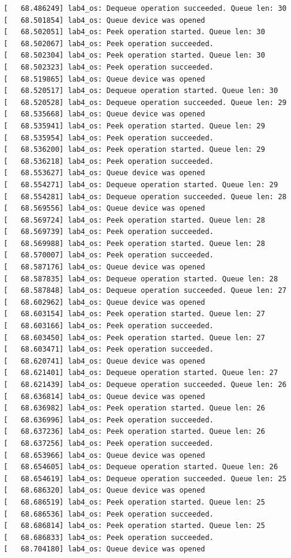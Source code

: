 \documentclass[a4paper,14pt]{extarticle}
\begin{document}
\begin{verbatim}
[   68.486249] lab4_os: Dequeue operation succeeded. Queue len: 30
[   68.501854] lab4_os: Queue device was opened
[   68.502051] lab4_os: Peek operation started. Queue len: 30
[   68.502067] lab4_os: Peek operation succeeded.
[   68.502304] lab4_os: Peek operation started. Queue len: 30
[   68.502323] lab4_os: Peek operation succeeded.
[   68.519865] lab4_os: Queue device was opened
[   68.520517] lab4_os: Dequeue operation started. Queue len: 30
[   68.520528] lab4_os: Dequeue operation succeeded. Queue len: 29
[   68.535668] lab4_os: Queue device was opened
[   68.535941] lab4_os: Peek operation started. Queue len: 29
[   68.535954] lab4_os: Peek operation succeeded.
[   68.536200] lab4_os: Peek operation started. Queue len: 29
[   68.536218] lab4_os: Peek operation succeeded.
[   68.553627] lab4_os: Queue device was opened
[   68.554271] lab4_os: Dequeue operation started. Queue len: 29
[   68.554281] lab4_os: Dequeue operation succeeded. Queue len: 28
[   68.569556] lab4_os: Queue device was opened
[   68.569724] lab4_os: Peek operation started. Queue len: 28
[   68.569739] lab4_os: Peek operation succeeded.
[   68.569988] lab4_os: Peek operation started. Queue len: 28
[   68.570007] lab4_os: Peek operation succeeded.
[   68.587176] lab4_os: Queue device was opened
[   68.587835] lab4_os: Dequeue operation started. Queue len: 28
[   68.587848] lab4_os: Dequeue operation succeeded. Queue len: 27
[   68.602962] lab4_os: Queue device was opened
[   68.603154] lab4_os: Peek operation started. Queue len: 27
[   68.603166] lab4_os: Peek operation succeeded.
[   68.603450] lab4_os: Peek operation started. Queue len: 27
[   68.603471] lab4_os: Peek operation succeeded.
[   68.620741] lab4_os: Queue device was opened
[   68.621401] lab4_os: Dequeue operation started. Queue len: 27
[   68.621439] lab4_os: Dequeue operation succeeded. Queue len: 26
[   68.636814] lab4_os: Queue device was opened
[   68.636982] lab4_os: Peek operation started. Queue len: 26
[   68.636996] lab4_os: Peek operation succeeded.
[   68.637236] lab4_os: Peek operation started. Queue len: 26
[   68.637256] lab4_os: Peek operation succeeded.
[   68.653966] lab4_os: Queue device was opened
[   68.654605] lab4_os: Dequeue operation started. Queue len: 26
[   68.654619] lab4_os: Dequeue operation succeeded. Queue len: 25
[   68.686320] lab4_os: Queue device was opened
[   68.686519] lab4_os: Peek operation started. Queue len: 25
[   68.686536] lab4_os: Peek operation succeeded.
[   68.686814] lab4_os: Peek operation started. Queue len: 25
[   68.686833] lab4_os: Peek operation succeeded.
[   68.704180] lab4_os: Queue device was opened

\end{verbatim}
\end{document}
